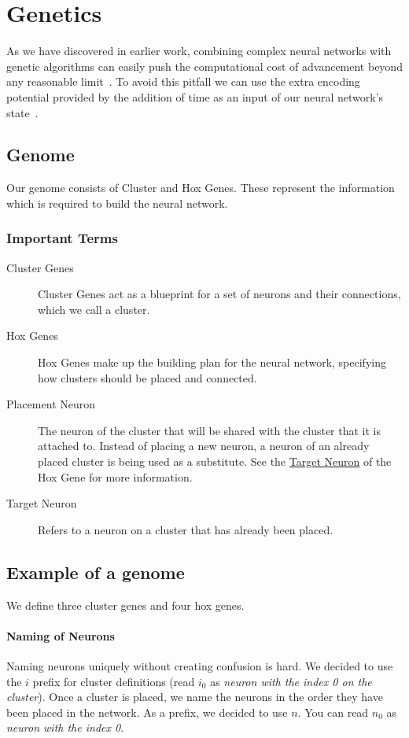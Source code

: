 \section{Genetics}

As we have discovered in earlier work, combining complex neural networks 
with genetic algorithms can easily push the computational cost of advancement
beyond any reasonable limit~\cite{Ferner2017}.
To avoid this pitfall we can use the extra encoding potential provided by 
the addition of time as an input of our neural network's state~\cite{Paugam-Moisy2012}.

\subsection{Genome}
Our genome consists of Cluster and Hox Genes.
These represent the information which is required to build the neural network.

\subsubsection{Important Terms}
\begin{description}
	\item[Cluster Genes] Cluster Genes act as a blueprint for a set of neurons and their connections, which we call a cluster.
	\item[Hox Genes] Hox Genes make up the building plan for the neural network,
	specifying how clusters should be placed and connected.
	\item[Placement Neuron] The neuron of the cluster that will be shared with the cluster that it is attached to. Instead of placing a new neuron, a neuron of an already placed cluster is being used as a substitute. See the \hyperref[item:target neuron]{Target Neuron} of the Hox Gene for more information.
	\item[Target Neuron\label{item:target neuron}] Refers to a neuron on a cluster that has already been placed.
\end{description}

\label{Example of a genome}
\subsection{Example of a genome}
We define three cluster genes and four hox genes.

\paragraph{Naming of Neurons}
Naming neurons uniquely without creating confusion is hard. We decided to use the $i$ prefix for cluster definitions (read $i_0$ as \emph{neuron with the index 0 on the cluster}).
Once a cluster is placed, we name the neurons in the order they have been placed in the network. As a prefix, we decided to use $n$. You can read $n_0$ as \emph{neuron with the index 0}.

